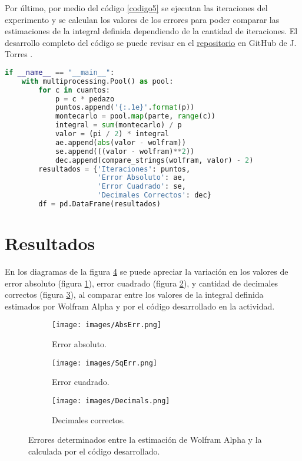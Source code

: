 \documentclass{report}
\begin{document}
Por \'ultimo, por medio del c\'odigo \ref{codigo5} se ejecutan las iteraciones del experimento y se calculan los valores de los errores para poder comparar las estimaciones de la integral definida dependiendo de la cantidad de iteraciones. El desarrollo completo del c\'odigo se puede revisar en el \href{https://github.com/FeroxDeitas/Simulacion-Nano/tree/main/Tareas/P5}{repositorio} en GitHub de J. Torres \cite{jorge1}.

\begin{lstlisting}[caption= Estimaci\'on de la Integral y C\'alculo de Errores, label=codigo5, language=Python]
if __name__ == "__main__":
    with multiprocessing.Pool() as pool:
        for c in cuantos:
            p = c * pedazo
            puntos.append('{:.1e}'.format(p))
            montecarlo = pool.map(parte, range(c))
            integral = sum(montecarlo) / p
            valor = (pi / 2) * integral
            ae.append(abs(valor - wolfram))
            se.append(((valor - wolfram)**2))
            dec.append(compare_strings(wolfram, valor) - 2)
        resultados = {'Iteraciones': puntos,
                      'Error Absoluto': ae,
                      'Error Cuadrado': se,
                      'Decimales Correctos': dec}
        df = pd.DataFrame(resultados)
\end{lstlisting}

\section{Resultados}\label{res}
En los diagramas de la figura \ref{errores} se puede apreciar la variaci\'on en los valores de error absoluto (figura \ref{errabs}), error cuadrado (figura \ref{errcua}), y cantidad de decimales correctos (figura \ref{decimal}), al comparar entre los valores de la integral definida estimados por Wolfram Alpha y por el c\'odigo desarrollado en la actividad.

\begin{figure}[h]
     \centering
     \begin{subfigure}[b]{0.49\textwidth}
         \centering
         \texttt{[image: images/AbsErr.png]}
         \caption{Error absoluto.}
         \label{errabs}
     \end{subfigure}
     \begin{subfigure}[b]{0.49\textwidth}
         \centering
         \texttt{[image: images/SqErr.png]}
         \caption{Error cuadrado.}
         \label{errcua}
     \end{subfigure}
     \begin{subfigure}[b]{0.49\textwidth}
         \centering
         \texttt{[image: images/Decimals.png]}
         \caption{Decimales correctos.}
         \label{decimal}
     \end{subfigure}
     \caption{Errores determinados entre la estimaci\'on de Wolfram Alpha y la calculada por el c\'odigo desarrollado.}
     \label{errores}
\end{figure}
\end{document}

